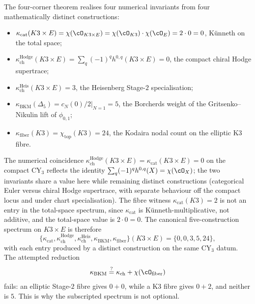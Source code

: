 \begin{remark}
\label{rem:k3e-four-kappa-spectrum}
The four-corner theorem realises four numerical invariants from four
mathematically distinct constructions:
\begin{itemize}
\item $\kappa_{\mathrm{cat}}(K3 \times E) = \chi(\cO_{K3 \times E})
 = \chi(\cO_{K3}) \cdot \chi(\cO_E) = 2 \cdot 0 = 0$, K\"unneth on
 the total space;
\item $\kappa_{\mathrm{ch}}^{\mathrm{Hodge}}(K3 \times E) = \sum_q (-1)^q
 h^{0, q}(K3 \times E) = 0$, the compact chiral Hodge supertrace;
\item $\kappa_{\mathrm{ch}}^{\mathrm{Heis}}(K3 \times E) = 3$, the
 Heisenberg Stage-$2$ specialisation;
\item $\kappa_{\mathrm{BKM}}(\Delta_5) = \left.c_N(0)/2\right|_{N=1} = 5$, the Borcherds
 weight of the Gritsenko--Nikulin lift of $\phi_{0,1}$;
\item $\kappa_{\mathrm{fiber}}(K3) = \chi_{\mathrm{top}}(K3) = 24$,
 the Kodaira nodal count on the elliptic K3 fibre.
\end{itemize}
The numerical coincidence
\(\kappa_{\mathrm{ch}}^{\mathrm{Hodge}}(K3 \times E) = \kappa_{\mathrm{cat}}(K3 \times E) = 0\)
on the compact CY$_3$ reflects the identity
\(\sum_q (-1)^q h^{0, q}(X) = \chi(\cO_X)\); the two invariants share a
value here while remaining distinct constructions (categorical Euler
versus chiral Hodge supertrace, with separate behaviour off the compact
locus and under chart specialisation). The fibre witness
\(\kappa_{\mathrm{cat}}(K3) = 2\) is not an entry in the total-space
spectrum, since \(\kappa_{\mathrm{cat}}\) is K\"unneth-multiplicative,
not additive, and the total-space value is \(2 \cdot 0 = 0\). The
canonical five-construction spectrum on \(K3 \times E\) is therefore
\[
\{\kappa_{\mathrm{cat}}, \kappa_{\mathrm{ch}}^{\mathrm{Hodge}},
 \kappa_{\mathrm{ch}}^{\mathrm{Heis}}, \kappa_{\mathrm{BKM}},
 \kappa_{\mathrm{fiber}}\}(K3 \times E) = \{0, 0, 3, 5, 24\},
\]
with each entry produced by a distinct construction on the same CY$_3$
datum. The attempted reduction
\[
\kappa_{\mathrm{BKM}} \stackrel{?}{=} \kappa_{\mathrm{ch}} +
\chi(\cO_{\mathrm{fiber}})
\]
fails: an elliptic Stage-$2$ fibre gives \(0+0\), while a K3 fibre gives
\(0+2\), and neither is \(5\). This is why the subscripted spectrum is
not optional.
\end{remark}

